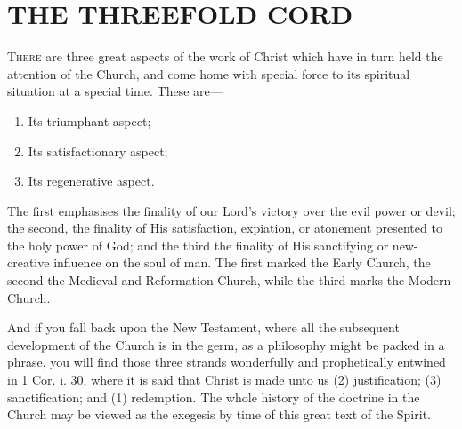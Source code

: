 \documentclass[12pt,letterpaper,oneside]{book}
\begin{document}
\chapter{THE THREEFOLD CORD}


\textsc{There} are three great aspects of the work 
of Christ which have in turn held the 
attention of the Church, and come home with 
special force to its spiritual situation at a special 
time. These are--- 

\begin{enumerate}
\item Its triumphant aspect; 
\item Its satisfactionary aspect; 
\item Its regenerative aspect. 
\end{enumerate}

The first emphasises the finality of our Lord's 
victory over the evil power or devil; the second, 
the finality of His satisfaction, expiation, or 
atonement presented to the holy power of God; 
and the third the finality of His sanctifying or 
new-creative influence on the soul of man. The 
first marked the Early Church, the second the 
Medieval and Reformation Church, while the 
third marks the Modern Church. 

And if you fall back upon the New Testament, 
where all the subsequent development of the 
Church is in the germ, as a philosophy might be 
packed in a phrase, you will find those three 
strands wonderfully and prophetically entwined 
in 1 Cor. i. 30, where it is said that Christ is 
made unto us (2) justification; (3) sanctification; 
and (1) redemption. The whole history of the 
doctrine in the Church may be viewed as the 
exegesis by time of this great text of the Spirit. 
\end{document}
